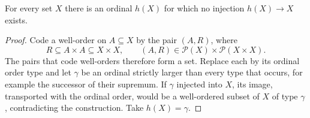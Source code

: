 \begin{lemma}[Hartogs]
\label{lem:hartogs}
For every set $X$ there is an ordinal $h(X)$ for which no injection
$h(X)\to X$ exists.
\end{lemma}
\begin{proof}
Code a well-order on $A\subseteq X$ by the pair $(A,R)$, where
\[
R\subseteq A\times A\subseteq X\times X,\qquad
(A,R)\in\mathcal P(X)\times\mathcal P(X\times X).
\]
The pairs that code well-orders therefore form a set. Replace each by its ordinal
order type and let $\gamma$ be an ordinal strictly larger than every type
that occurs, for example the successor of their supremum. If $\gamma$
injected into $X$, its image, transported with the ordinal order, would be a
well-ordered subset of $X$ of type $\gamma$, contradicting the construction.
Take $h(X)=\gamma$.
\end{proof}

